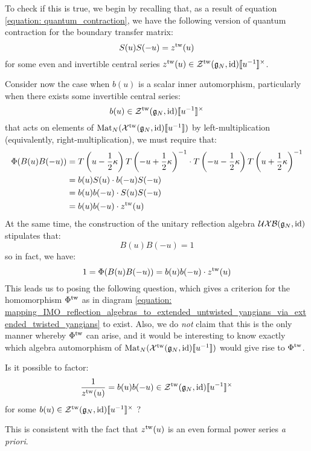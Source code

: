             To check if this is true, we begin by recalling that, as a result of equation \eqref{equation: quantum_contraction}, we have the following version of quantum contraction for the boundary transfer matrix:
                $$S(u) S(-u) = z^{\mathrm{tw}}(u)$$
            for some even and invertible central series $z^{\tw}(u) \in \calZ^{\tw}(\g_N, \id)[\![u^{-1}]\!]^{\x}$.
            
            Consider now the case when $b(u)$ is a scalar inner automorphism, particularly when there exists some invertible central series:
                $$b(u) \in \calZ^{\tw}(\g_N, \id)[\![u^{-1}]\!]^{\x}$$
            that acts on elements of $\mathrm{Mat}_N(\mathcal{X}^{\mathrm{tw}}(\mathfrak{g}_N, \mathrm{id})[\![u^{-1}]\!])$ by left-multiplication (equivalently, right-multiplication), we must require that:
                $$
                    \begin{aligned}
                        \Phi( B(u) B(-u) ) & = T\left(u - \frac12 \kappa\right) T\left(-u + \frac12 \kappa\right)^{-1} \cdot T\left(-u - \frac12 \kappa\right) T\left(u + \frac12 \kappa\right)^{-1}
                        \\
                        & = b(u) S(u) \cdot b(-u) S(-u)
                        \\
                        & = b(u) b(-u) \cdot S(u) S(-u)
                        \\
                        & = b(u) b(-u) \cdot z^{\mathrm{tw}}(u)
                    \end{aligned}
                $$
            At the same time, the construction of the unitary reflection algebra $\mathcal{UXB}(\mathfrak{g}_N, \mathrm{id})$ stipulates that:
                $$B(u) B(-u) = 1$$
            so in fact, we have:
                $$1 = \Phi( B(u) B(-u) ) = b(u) b(-u) \cdot z^{\mathrm{tw}}(u)$$
            This leads us to posing the following question, which gives a criterion for the homomorphism $\Phi^{\mathrm{tw}}$ as in diagram \eqref{equation: mapping_IMO_reflection_algebras_to_extended_untwisted_yangians_via_extended_twisted_yangians} to exist. Also, we do \textit{not} claim that this is the only manner whereby $\Phi^{\mathrm{tw}}$ can arise, and it would be interesting to know exactly which algebra automorphism of $\mathrm{Mat}_N( \mathcal{X}^{\mathrm{tw}}(\mathfrak{g}_N, \mathrm{id})[\![u^{-1}]\!] )$ would give rise to $\Phi^{\mathrm{tw}}$. 
            \begin{question} \label{question: square_roots_of_quantum_contractions}
                Is it possible to factor:
                    \begin{equation} \label{equation: square_roots_of_quantum_contractions}
                        \frac{1}{z^{\tw}(u)} = b(u) b(-u) \in \calZ^{\tw}(\g_N, \id)[\![u^{-1}]\!]^{\x}
                    \end{equation}
                for some $b(u) \in \calZ^{\tw}(\g_N, \id)[\![u^{-1}]\!]^{\x}$ ?
            \end{question}
            \begin{remark}
                This is consistent with the fact that $z^{\mathrm{tw}}(u)$ is an even formal power series \textit{a priori}.
            \end{remark}

